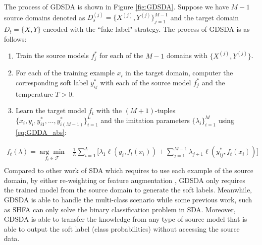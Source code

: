 The process of GDSDA is shown in Figure \ref{fig:GDSDA}. Suppose we have $M-1$ source domains denoted as $D_s^{(j)}=\{X^{(j)},Y^{(j)}\}_{j=1}^{M-1}$ and the target domain $D_t=\{X,Y\}$ encoded with the ``fake label" strategy. The process of GDSDA is as follows:
\begin{enumerate}
    \item Train the source models $f^*_j$ for each of the $M-1$ domains with $\{X^{(j)},Y^{(j)}\}$.
    \item For each of the training example $x_i$ in the target domain, computer the corresponding soft label $y^*_{ij}$ with each of the source model $f^*_j$ and the temperature $T>0$.
    \item Learn the target model $f_t$ with the $(M+1)$-tuples $\{x_i,y_i,y^*_{i1},\dots,y^*_{i(M-1)}\}_{i=1}^L$ and the imitation parameters $\{\lambda_i\}^M_{i=1}$ using \eqref{eq:GDDA_abs}:
\end{enumerate} 
\begin{equation}\label{eq:GDDA_abs}
\begin{aligned}
f_t(\lambda)=\underset{f_t \in \mathcal{F}}{\arg \min}&\frac{1}{L}\sum_{i=1}^{L}\bigg[\lambda_1\ell\left(y_i,f_t(x_i)\right)+\sum_{j=1}^{M-1}\lambda_{j+1}\ell\left(y^*_{ij},f_t(x_i)\right)\bigg]\qquad\\
\end{aligned}
\end{equation}
Compared to other work of SDA which requires to use each example of the source domain, by either re-weighting \cite{Donahue_2013_CVPR,duan2012visual} or feature augmentation \cite{daume2010frustratingly}, GDSDA only requires the trained model from the source domain to generate the soft labels. 
Meanwhile, GDSDA is able to handle the multi-class scenario while some previous work, such as SHFA\cite{duan2012learning} can only solve the binary classification problem in SDA. Moreover, GDSDA is able to transfer the knowledge from any type of source model that is able to output the soft label (class probabilities) without accessing the source data.


